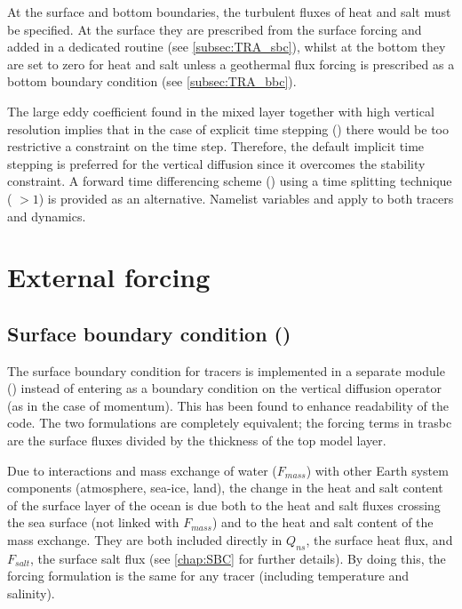 \documentclass[../main/NEMO_manual]{subfiles}
\begin{document}
At the surface and bottom boundaries, the turbulent fluxes of heat and salt must be specified.
At the surface they are prescribed from the surface forcing and added in a dedicated routine
(see \autoref{subsec:TRA_sbc}), whilst at the bottom they are set to zero for heat and salt unless
a geothermal flux forcing is prescribed as a bottom boundary condition (see \autoref{subsec:TRA_bbc}). 

The large eddy coefficient found in the mixed layer together with high vertical resolution implies that
in the case of explicit time stepping ()
there would be too restrictive a constraint on the time step.
Therefore, the default implicit time stepping is preferred for the vertical diffusion since
it overcomes the stability constraint.
A forward time differencing scheme () using
a time splitting technique ( $> 1$) is provided as an alternative.
Namelist variables  and  apply to both tracers and dynamics. 

\section{External forcing}
\label{sec:TRA_sbc_qsr_bbc}

\subsection{Surface boundary condition (\protect{})}
\label{subsec:TRA_sbc}

The surface boundary condition for tracers is implemented in a separate module () instead of
entering as a boundary condition on the vertical diffusion operator (as in the case of momentum).
This has been found to enhance readability of the code.
The two formulations are completely equivalent;
the forcing terms in trasbc are the surface fluxes divided by the thickness of the top model layer. 

Due to interactions and mass exchange of water ($F_{mass}$) with other Earth system components
(\ie atmosphere, sea-ice, land), the change in the heat and salt content of the surface layer of the ocean is due
both to the heat and salt fluxes crossing the sea surface (not linked with $F_{mass}$) and
to the heat and salt content of the mass exchange.
They are both included directly in $Q_{ns}$, the surface heat flux,
and $F_{salt}$, the surface salt flux (see \autoref{chap:SBC} for further details).
By doing this, the forcing formulation is the same for any tracer (including temperature and salinity).
\end{document}
